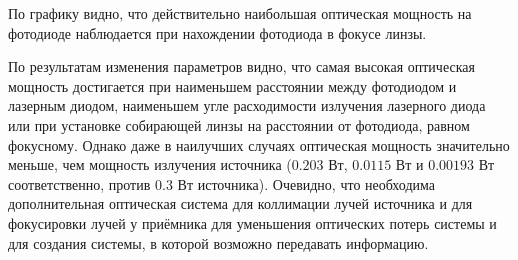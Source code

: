 По графику видно, что действительно наибольшая оптическая мощность на фотодиоде наблюдается при нахождении фотодиода в фокусе линзы. 

По результатам изменения параметров видно, что самая высокая оптическая мощность достигается при наименьшем расстоянии между фотодиодом и лазерным диодом, наименьшем угле расходимости излучения лазерного диода или при установке собирающей линзы на расстоянии от фотодиода, равном фокусному. Однако даже в наилучших случаях оптическая мощность значительно меньше, чем мощность излучения источника ($0.203$ Вт, $0.0115$ Вт и $0.00193$ Вт соответственно, против $0.3$ Вт источника). Очевидно, что необходима дополнительная оптическая система для коллимации лучей источника и для фокусировки лучей у приёмника для уменьшения оптических потерь системы и для создания системы, в которой возможно передавать информацию.